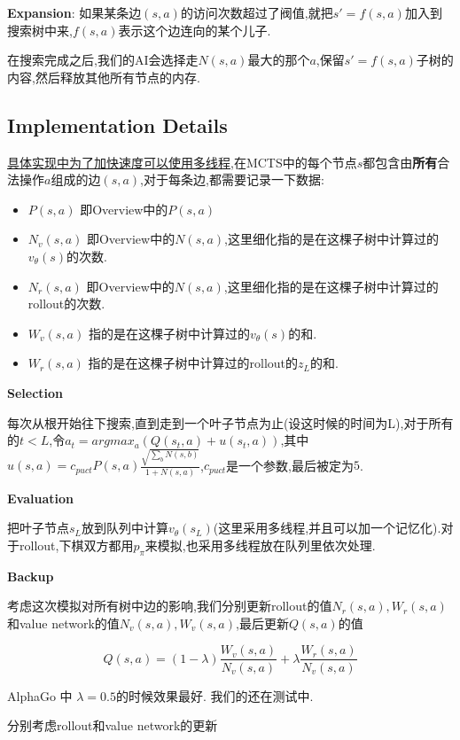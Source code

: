 \documentclass[twocolumn]{article}
\begin{document}
\noindent\textbf{Expansion}: 如果某条边$(s, a)$的访问次数超过了阀值,就把$s'= f(s,a)$加入到搜索树中来,$f(s,a)$表示这个边连向的某个儿子.

在搜索完成之后,我们的AI会选择走$N(s, a)$最大的那个$a$,保留$s'=f(s, a)$子树的内容,然后释放其他所有节点的内存.

\subsection{Implementation Details}

\underline{具体实现中为了加快速度可以使用多线程},在MCTS中的每个节点$s$都包含由\textbf{所有}合法操作$a$组成的边$(s,a)$,对于每条边,都需要记录一下数据:

\begin{itemize}
	\item $P(s, a)$ 即Overview中的$P(s, a)$
	\item $N_v(s, a)$ 即Overview中的$N(s, a)$,这里细化指的是在这棵子树中计算过的$v_\theta(s)$的次数.
	\item $N_r(s, a)$ 即Overview中的$N(s, a)$,这里细化指的是在这棵子树中计算过的rollout的次数.
	\item $W_v(s, a)$ 指的是在这棵子树中计算过的$v_\theta(s)$的和.
	\item $W_r(s, a)$ 指的是在这棵子树中计算过的rollout的$z_L$的和.
\end{itemize}

\noindent\textbf{Selection}

每次从根开始往下搜索,直到走到一个叶子节点为止(设这时候的时间为L),对于所有的$t < L$,令$a_t = argmax_a(Q(s_t, a) + u(s_t, a))$,其中$u(s, a) = c_{puct}P(s, a)\frac{\sqrt{\sum_{b}N(s,b)}}{1+N(s,a)}$,$c_{puct}$是一个参数,最后被定为$5$.

\noindent\textbf{Evaluation}

把叶子节点$s_L$放到队列中计算$v_\theta(s_L)$(这里采用多线程,并且可以加一个记忆化).对于rollout,下棋双方都用$p_\pi$来模拟,也采用多线程放在队列里依次处理.

\noindent\textbf{Backup}

考虑这次模拟对所有树中边的影响,我们分别更新rollout的值$N_r(s, a), W_r(s, a)$和value network的值$N_v(s, a), W_v(s, a)$,最后更新$Q(s, a)$的值

\[
Q(s, a) = (1 - \lambda)\frac{W_v(s,a)}{N_v(s,a)}+\lambda\frac{W_r(s,a)}{N_v(s,a)}
\]

AlphaGo 中 $\lambda=0.5$的时候效果最好. \textcolor[rgb]{1,0,0}{我们的还在测试中.}

分别考虑rollout和value network的更新
\end{document}
